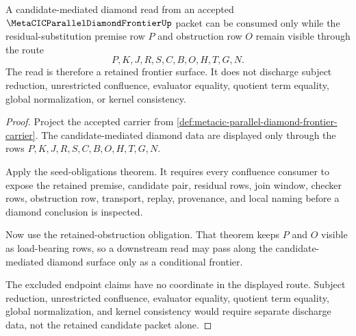 \begin{theorem}
\label{thm:metacic-parallel-diamond-frontier-discharge-boundary}
A candidate-mediated diamond read from an accepted $\MetaCICParallelDiamondFrontierUp$ packet can be consumed only while the residual-substitution premise row $P$ and obstruction row $O$ remain visible through the route
$$
P,K,J,R,S,C,B,O,H,T,G,N .
$$
The read is therefore a retained frontier surface. It does not discharge subject reduction, unrestricted confluence, evaluator equality, quotient term equality, global normalization, or kernel consistency.
\end{theorem}
\begin{proof}
Project the accepted carrier from \autoref{def:metacic-parallel-diamond-frontier-carrier}. The candidate-mediated diamond data are displayed only through the rows $P,K,J,R,S,C,B,O,H,T,G,N$.

Apply the seed-obligations theorem. It requires every confluence consumer to expose the retained premise, candidate pair, residual rows, join window, checker rows, obstruction row, transport, replay, provenance, and local naming before a diamond conclusion is inspected.

Now use the retained-obstruction obligation. That theorem keeps $P$ and $O$ visible as load-bearing rows, so a downstream read may pass along the candidate-mediated diamond surface only as a conditional frontier.

The excluded endpoint claims have no coordinate in the displayed route. Subject reduction, unrestricted confluence, evaluator equality, quotient term equality, global normalization, and kernel consistency would require separate discharge data, not the retained candidate packet alone.
\end{proof}

